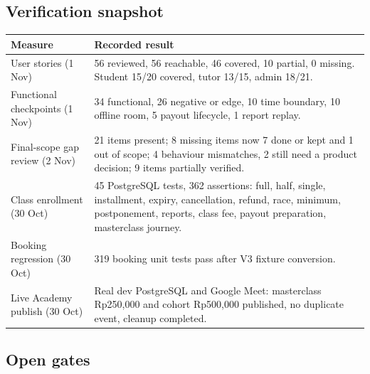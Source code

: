 \documentclass[11pt,a4paper]{article}
\begin{document}
\subsection{Verification snapshot}

\begin{tabular}{@{}L{5.2cm}L{10.4cm}@{}}
\toprule
\textbf{Measure} & \textbf{Recorded result} \\
\midrule
User stories (1 Nov) & 56 reviewed, 56 reachable, 46 covered, 10 partial, 0 missing. Student 15/20 covered, tutor 13/15, admin 18/21. \\
Functional checkpoints (1 Nov) & 34 functional, 26 negative or edge, 10 time boundary, 10 offline room, 5 payout lifecycle, 1 report replay. \\
Final-scope gap review (2 Nov) & 21 items present; 8 missing items now 7 done or kept and 1 out of scope; 4 behaviour mismatches, 2 still need a product decision; 9 items partially verified. \\
Class enrollment (30 Oct) & 45 PostgreSQL tests, 362 assertions: full, half, single, installment, expiry, cancellation, refund, race, minimum, postponement, reports, class fee, payout preparation, masterclass journey. \\
Booking regression (30 Oct) & 319 booking unit tests pass after V3 fixture conversion. \\
Live Academy publish (30 Oct) & Real dev PostgreSQL and Google Meet: masterclass Rp250,000 and cohort Rp500,000 published, no duplicate event, cleanup completed. \\
\bottomrule
\end{tabular}

\subsection{Open gates}
\end{document}
